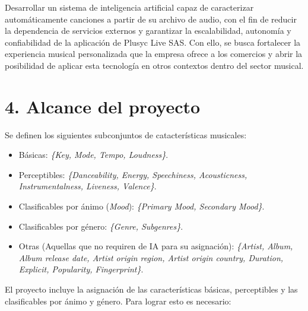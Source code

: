 \documentclass[
11pt, %
]{charter}
\begin{document}
Desarrollar un sistema de inteligencia artificial capaz de caracterizar automáticamente canciones a partir de su archivo de audio, con el fin de reducir la dependencia de servicios externos y garantizar la escalabilidad, autonomía y confiabilidad de la aplicación de Plusyc Live SAS. Con ello, se busca fortalecer la experiencia musical personalizada que la empresa ofrece a los comercios y abrir la posibilidad de aplicar esta tecnología en otros contextos dentro del sector musical.

\section{4. Alcance del proyecto}
\label{sec:alcance}




Se definen los siguientes subconjuntos de catacterísticas musicales:
\begin{itemize}
  \item Básicas: \textit{\{Key, Mode, Tempo, Loudness\}}.
  \item Perceptibles: \textit{\{Danceability, Energy, Speechiness, Acousticness, Instrumentalness, Liveness, Valence\}}.
  \item Clasificables por ánimo (\textit{Mood}): \textit{\{Primary Mood, Secondary Mood\}}.
  \item Clasificables por género: \textit{\{Genre, Subgenres\}}.
  \item Otras (Aquellas que no requiren de IA para su asignación): \textit{\{Artist, Album, Album release date, Artist origin region, Artist origin country, Duration, Explicit, Popularity, Fingerprint\}}.
\end{itemize}

El proyecto incluye la asignación de las características básicas, perceptibles y las clasificables por ánimo y género. Para lograr esto es necesario:
\end{document}
